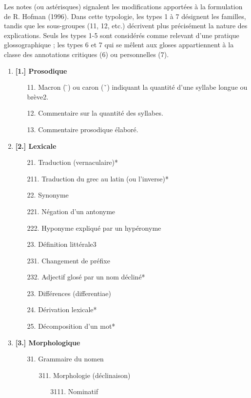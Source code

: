 \documentclass[a4paper, twoside, 12pt]{book}
\begin{document}
{Les notes (ou astérisques) signalent les modifications apportées à la formulation de R. Hofman (1996). Dans cette typologie, les types 1 à 7 désignent les familles, tandis que les sous-groupes (11, 12, etc.) décrivent plus précisément la nature des explications. Seuls les types 1-5 sont considérés comme relevant d'une pratique glossographique ; les types 6 et 7 qui se mêlent aux gloses appartiennent à la classe des annotations critiques (6) ou personnelles (7).

\begin{enumerate}
  \item\textbf{[1.] Prosodique}
  \begin{enumerate}
    \item[11.] Macron ( ̄) ou caron (ˇ) indiquant la quantité d'une syllabe longue ou brève2.
    \item[12.] Commentaire sur la quantité des syllabes.
    \item[13.] Commentaire prosodique élaboré.
  \end{enumerate}
  \item\textbf{[2.] Lexicale}
  \begin{enumerate}
    \item[21.] Traduction (vernaculaire)*
    \item[211.] Traduction du grec au latin (ou l'inverse)*
    \item[22.] Synonyme
    \item[221.] Négation d'un antonyme
    \item[222.] Hyponyme expliqué par un hypéronyme
    \item[23.] Définition littérale3
    \item[231.] Changement de préfixe
    \item[232.] Adjectif glosé par un nom décliné*
    \item[23.] Différences (differentiae)
    \item[24.] Dérivation lexicale*
    \item[25.] Décomposition d'un mot*
  \end{enumerate}
  \item\textbf{[3.] Morphologique}
  \begin{enumerate}
    \item[31.] Grammaire du nomen
    \begin{enumerate}
      \item[311.] Morphologie (déclinaison)
      \begin{enumerate}
        \item[3111.] Nominatif

\end{enumerate}
\end{enumerate}
\end{enumerate}
\end{enumerate}}
\end{document}
